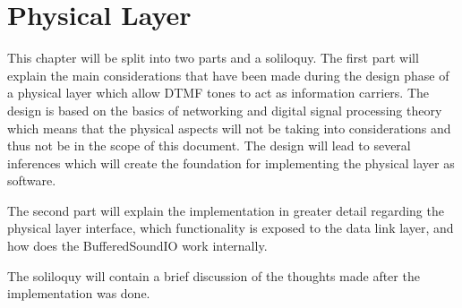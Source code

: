 \chapter{Physical Layer}
This chapter will be split into two parts and a soliloquy. The first part will
explain the main considerations that have been made during the design phase of
a physical layer which allow DTMF tones to act as information carriers.
The design is based on the basics of networking and digital signal processing
theory which means that the physical aspects will not be taking into considerations
and thus not be in the scope of this document. The design will lead to several
inferences which will create the foundation for implementing the physical layer as software.

The second part will explain the implementation in greater detail regarding the physical layer
interface, which functionality is exposed to the data link layer, and how does the BufferedSoundIO
work internally.

The soliloquy will contain a brief discussion of the thoughts made after the implementation
was done.

